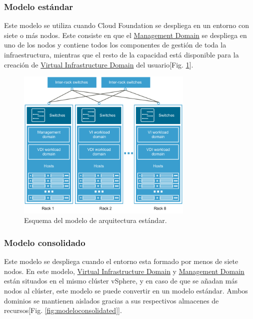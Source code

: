 \subsubsection{Modelo estándar}
Este modelo se utiliza cuando Cloud Foundation se despliega en un entorno con siete o más nodos. Este consiste en que el \underline{Management Domain} se despliega en uno de los nodos y contiene todos los componentes de gestión de toda la infraestructura, mientras que el resto de la capacidad está disponible para la creación de \underline{Virtual Infrastructure Domain} del usuario[Fig. \ref{fig:modelostandard}].

\begin{figure}[h!]
  \centering
  \includegraphics[width=0.75\textwidth]{imaxes/conceptosPrevios/arquitect_standarCF.png}
  \caption{Esquema del modelo de arquitectura estándar.}
  \label{fig:modelostandard}
\end{figure}
\FloatBarrier
\subsubsection{Modelo consolidado}
Este modelo se despliega cuando el entorno esta formado por menos de siete nodos. En este modelo, \underline{Virtual Infrastructure Domain} y \underline{Management Domain} están situados en el mismo clúster vSphere, y en caso de que se añadan más nodos al clúster, este modelo se puede convertir en un modelo estándar. Ambos dominios se mantienen aislados gracias a sus respectivos almacenes de recursos[Fig. \ref{fig:modeloconsolidated}].

